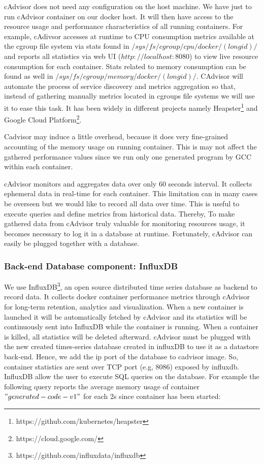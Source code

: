 cAdvisor does not need any configuration on the host machine. We have just to run cAdvisor container on our docker host. It will then have access to the resource usage and performance characteristics of all running containers. For example, cAdivsor accesses at runtime to CPU consumption metrics available at the cgroup file system via stats found in $/sys/fs/cgroup/cpu/docker/(longid)/$ and reports all statistics via web UI ($http://localhost:8080$) to view live resource consumption for each container. Stats related to memory consumption can be found as well in $/sys/fs/cgroup/memory/docker/(longid)/$. CAdvisor will automate the process of service discovery and metrics aggregation so that, instead of gathering manually metrics located in cgroups file systems we will use it to ease this task. It has been widely in different projects namely Heapster\footnote{https://github.com/kubernetes/heapster} and Google Cloud Platform\footnote{https://cloud.google.com/}.

Cadvisor may induce a little overhead, because it does very fine-grained accounting of the memory usage on running container. This is may not affect the gathered performance values since we run only one generated program by GCC within each container.

cAdvisor monitors and aggregates data over only 60 seconds interval. It collects ephemeral data in real-time for each container. This limitation can in many cases be overseen but we would like to record all data over time. This is useful to execute queries and define metrics from historical data. Thereby, To make gathered data from cAdvisor truly valuable for monitoring resources usage, it becomes necessary to log it in a database at runtime. Fortunately, cAdvisor can easily be plugged together with a database.
\subsubsection{Back-end Database component: InfluxDB}
We use InfluxDB\footnote{https://github.com/influxdata/influxdb}, an open source distributed time series database as backend to record data. It collects docker container performance metrics through cAdvisor for long-term retention, analytics and visualization. When a new container is launched it will be automatically fetched by cAdvisor and its statistics will be continuously sent into InfluxDB while the container is running. When a container is killed, all statistics will be deleted afterward. cAdvisor must be plugged with the new created
times-series database created in influxDB to use it as a datastore back-end. Hence, we add the ip port of the database to cadvisor image. So, container statistics are sent over TCP port (e.g, 8086) exposed by influxdb.
InfluxDB allow the user to execute SQL queries on the database. For example the following query reports the average memory usage of container $"generated-code-v1"$ for each 2s since container has been started:

